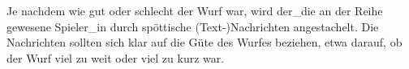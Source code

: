 Je nachdem wie gut oder schlecht der Wurf war, wird der\_die an der Reihe gewesene Spieler\_in 
durch spöttische (Text-)Nachrichten angestachelt. Die Nachrichten sollten sich klar auf
die Güte des Wurfes beziehen, etwa darauf, ob der Wurf viel zu weit oder viel zu kurz war.